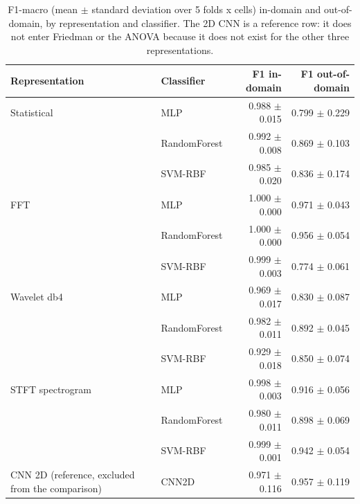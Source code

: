 \begin{table}[htbp]
\centering
\caption{F1-macro (mean $\pm$ standard deviation over 5 folds x cells) in-domain and out-of-domain, by representation and classifier. The 2D CNN is a reference row: it does not enter Friedman or the ANOVA because it does not exist for the other three representations.}
\label{tab:f1-dentro-fuera}
\begin{tabular}{llrr}
\toprule
Representation & Classifier & F1 in-domain & F1 out-of-domain \\
\midrule
Statistical & MLP & 0.988 $\pm$ 0.015 & 0.799 $\pm$ 0.229 \\
 & RandomForest & 0.992 $\pm$ 0.008 & 0.869 $\pm$ 0.103 \\
 & SVM-RBF & 0.985 $\pm$ 0.020 & 0.836 $\pm$ 0.174 \\
FFT & MLP & 1.000 $\pm$ 0.000 & 0.971 $\pm$ 0.043 \\
 & RandomForest & 1.000 $\pm$ 0.000 & 0.956 $\pm$ 0.054 \\
 & SVM-RBF & 0.999 $\pm$ 0.003 & 0.774 $\pm$ 0.061 \\
Wavelet db4 & MLP & 0.969 $\pm$ 0.017 & 0.830 $\pm$ 0.087 \\
 & RandomForest & 0.982 $\pm$ 0.011 & 0.892 $\pm$ 0.045 \\
 & SVM-RBF & 0.929 $\pm$ 0.018 & 0.850 $\pm$ 0.074 \\
STFT spectrogram & MLP & 0.998 $\pm$ 0.003 & 0.916 $\pm$ 0.056 \\
 & RandomForest & 0.980 $\pm$ 0.011 & 0.898 $\pm$ 0.069 \\
 & SVM-RBF & 0.999 $\pm$ 0.001 & 0.942 $\pm$ 0.054 \\
CNN 2D (reference, excluded from the comparison) & CNN2D & 0.971 $\pm$ 0.116 & 0.957 $\pm$ 0.119 \\
\bottomrule
\end{tabular}
\end{table}
